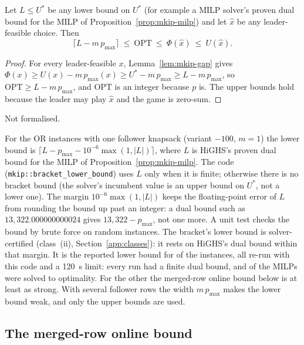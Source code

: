 \begin{theorem}[Bracket]\label{thm:mkip-bracket}
Let $L\le U^{*}$ be any lower bound on $U^{*}$ (for example a MILP solver's
proven dual bound for the MILP of Proposition~\ref{prop:mkip-milp}) and let
$\hat x$ be any leader-feasible choice. Then
\[
  \lceil L-m\,p_{\max}\rceil\ \le\ \mathrm{OPT}\ \le\ \Phi(\hat x)\ \le\ U(\hat x).
\]
\end{theorem}
\begin{proof}
For every leader-feasible $x$, Lemma~\ref{lem:mkip-gap} gives
$\Phi(x)\ge U(x)-m\,p_{\max}(x)\ge U^{*}-m\,p_{\max}\ge L-m\,p_{\max}$, so
$\mathrm{OPT}\ge L-m\,p_{\max}$, and $\mathrm{OPT}$ is an integer because $p$ is.
The upper bounds hold because the leader may play $\hat x$ and the game is
zero-sum.
\end{proof}
\noindent Not formalised.

For the OR instances with one follower knapsack (variant $-100$, $m=1$) the
lower bound is $\lceil L-p_{\max}-10^{-6}\max(1,|L|)\rceil$, where $L$ is HiGHS's
proven dual bound for the MILP of Proposition~\ref{prop:mkip-milp}. The code
(\texttt{mkip::bracket\_lower\_bound}) uses $L$ only when it is finite; otherwise
there is no bracket bound (the solver's incumbent value is an upper bound on
$U^{*}$, not a lower one). The margin $10^{-6}\max(1,|L|)$ keeps the
floating-point error of $L$ from rounding the bound up past an integer: a dual
bound such as $13{,}322.000000000024$ gives $13{,}322-p_{\max}$, not one more.
A unit test checks the bound by brute force on random instances. The bracket's
lower bound is solver-certified (class~(ii), Section~\ref{app:classes}): it rests
on HiGHS's dual bound within that margin. It is the reported lower bound for
\SuppOrLbMilp{} of the \NumOrOneKnapsack{} instances, all re-run with this code and
a 120~s limit: every run had a finite dual bound, and \SuppOrBracketOptimal{} of
the MILPs were solved to optimality. For the other \SuppOrLbOmega{} the merged-row
online bound below is at least as strong. With several follower rows the width
$m\,p_{\max}$ makes the lower bound weak, and only the upper bounds are used.

\subsection{The merged-row online bound}

